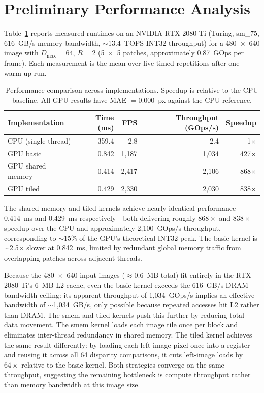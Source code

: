 \documentclass[11pt]{article}
\begin{document}
\section{Preliminary Performance Analysis}

Table~\ref{tab:perf} reports measured runtimes on an NVIDIA RTX 2080 Ti (Turing, sm\_75,
616~GB/s memory bandwidth, $\sim$13.4~TOPS INT32 throughput) for a 480~$\times$~640 image
with $D_{\max} = 64$, $R = 2$ (5~$\times$~5 patches, approximately 0.87~GOps per frame).
Each measurement is the mean over five timed repetitions after one warm-up run.

\begin{table}[H]
\centering
\caption{Performance comparison across implementations. Speedup is relative to the CPU baseline.
All GPU results have MAE $= 0.000$~px against the CPU reference.}
\label{tab:perf}
\begin{tabular}{lrrrr}
\toprule
Implementation & Time (ms) & FPS & Throughput (GOps/s) & Speedup \\
\midrule
CPU (single-thread) & 359.4 & 2.8     & 2.4     & 1$\times$   \\
GPU basic           & 0.842 & 1{,}187 & 1{,}034 & 427$\times$ \\
GPU shared memory   & 0.414 & 2{,}417 & 2{,}106 & 868$\times$ \\
GPU tiled           & 0.429 & 2{,}330 & 2{,}030 & 838$\times$ \\
\bottomrule
\end{tabular}
\end{table}

The shared memory and tiled kernels achieve nearly identical performance---0.414~ms and 0.429~ms
respectively---both delivering roughly $868\times$ and $838\times$ speedup over the CPU and
approximately 2{,}100~GOps/s throughput, corresponding to $\sim$15\% of the GPU's theoretical
INT32 peak. The basic kernel is $\sim$2.5$\times$ slower at 0.842~ms, limited by redundant global
memory traffic from overlapping patches across adjacent threads.

Because the 480~$\times$~640 input images ($\approx$0.6~MB total) fit entirely in the RTX
2080 Ti's 6~MB L2 cache, even the basic kernel exceeds the 616~GB/s DRAM bandwidth ceiling:
its apparent throughput of 1{,}034~GOps/s implies an effective bandwidth of $\sim$1{,}034~GB/s,
only possible because repeated accesses hit L2 rather than DRAM. The smem and tiled kernels
push this further by reducing total data movement. The smem kernel loads each image tile once
per block and eliminates inter-thread redundancy in shared memory. The tiled kernel achieves
the same result differently: by loading each left-image pixel once into a register and reusing
it across all 64 disparity comparisons, it cuts left-image loads by $64\times$ relative to the
basic kernel. Both strategies converge on the same throughput, suggesting the remaining
bottleneck is compute throughput rather than memory bandwidth at this image size.
\end{document}
